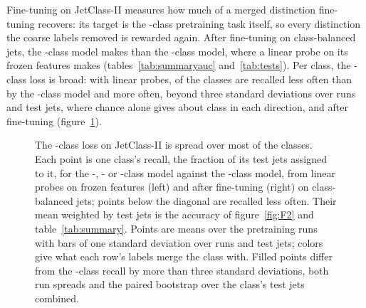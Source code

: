 Fine-tuning on JetClass-II measures how much of a merged distinction fine-tuning recovers: its target is
the \Kfull-class pretraining task itself, so every distinction the coarse labels removed is rewarded again.
After fine-tuning on \FtSizeESix{} class-balanced jets, the \Kcoarse-class model makes
 than the \Kfull-class model, where a linear probe on its frozen features makes
\MlstCmpJcTwoCoarseOverFullPr{} (tables~\ref{tab:summaryauc} and~\ref{tab:tests}). Per class, the \Kcoarse-class loss
is broad: with linear probes, \MlstJcTwoRecallCoarseLowClasses{} of the \Kfull{} classes are recalled less often
than by the \Kfull-class model and \MlstJcTwoRecallCoarseHighClassesWord{} more often, beyond three standard
deviations over runs and test jets, where chance alone gives about \MlstJcTwoRecallChanceOneSide{} class in each
direction, and after fine-tuning 
(figure~\ref{fig:PC-jc2}).

\begin{figure}[t]
\centering
{}
\caption{The \Kcoarse-class loss on JetClass-II is spread over most of the \Kfull{} classes. Each point is one
class's recall, the fraction of its test jets assigned to it, for the \Kres-, \Kmid- or \Kcoarse-class model
against the \Kfull-class model, from linear probes on frozen features (left) and after fine-tuning (right) on
\FtSizeESix{} class-balanced jets; points below the diagonal are recalled less often. Their mean weighted by test
jets is the accuracy of figure~\ref{fig:F2} and table~\ref{tab:summary}. Points are means over the \MlstNRunsWord{}
pretraining runs with bars of one standard deviation over runs and test jets; colors give what each
row's labels merge the class with. Filled points differ from the \Kfull-class recall by more than three
standard deviations, both run spreads and the paired bootstrap over the class's test jets combined.}
\label{fig:PC-jc2}
\end{figure}

